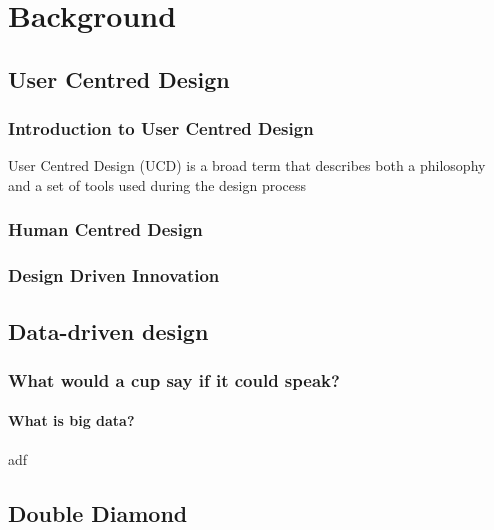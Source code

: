 
\chapter{Background}

	\section{User Centred Design}

		\subsection{Introduction to User Centred Design}

User Centred Design (UCD) is a broad term that describes both a philosophy and a set of tools used during the design process

		\subsection{Human Centred Design}
		
		
		\subsection{Design Driven Innovation}




	\section{Data-driven design}
	
		\subsection{What would a cup say if it could speak?}
		
			\subsubsection{What is big data?}



adf


	\section{Double Diamond}